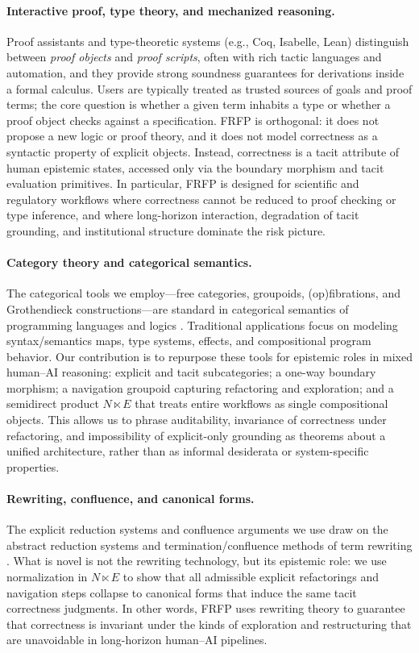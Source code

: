 \documentclass[11pt]{article}
\theoremstyle{definition}
\begin{document}
\paragraph{Interactive proof, type theory, and mechanized reasoning.}
Proof assistants and type-theoretic systems (e.g., Coq, Isabelle, Lean) distinguish between \emph{proof objects} and \emph{proof scripts}, often with rich tactic languages and automation, and they provide strong soundness guarantees for derivations inside a formal calculus. Users are typically treated as trusted sources of goals and proof terms; the core question is whether a given term inhabits a type or whether a proof object checks against a specification. FRFP is orthogonal: it does not propose a new logic or proof theory, and it does not model correctness as a syntactic property of explicit objects. Instead, correctness is a tacit attribute of human epistemic states, accessed only via the boundary morphism and tacit evaluation primitives. In particular, FRFP is designed for scientific and regulatory workflows where correctness cannot be reduced to proof checking or type inference, and where long-horizon interaction, degradation of tacit grounding, and institutional structure dominate the risk picture.

\paragraph{Category theory and categorical semantics.}
The categorical tools we employ---free categories, groupoids, (op)fibrations, and Grothendieck constructions---are standard in categorical semantics of programming languages and logics \citep{johnstone2002sketches,leinster2014basic,maclane1998categories}. Traditional applications focus on modeling syntax/semantics maps, type systems, effects, and compositional program behavior. Our contribution is to repurpose these tools for epistemic roles in mixed human--AI reasoning: explicit and tacit subcategories; a one-way boundary morphism; a navigation groupoid capturing refactoring and exploration; and a semidirect product $N \ltimes E$ that treats entire workflows as single compositional objects. This allows us to phrase auditability, invariance of correctness under refactoring, and impossibility of explicit-only grounding as theorems about a unified architecture, rather than as informal desiderata or system-specific properties.

\paragraph{Rewriting, confluence, and canonical forms.}
The explicit reduction systems and confluence arguments we use draw on the abstract reduction systems and termination/confluence methods of term rewriting \citep{baader1999term,terese2003term}. What is novel is not the rewriting technology, but its epistemic role: we use normalization in $N \ltimes E$ to show that all admissible explicit refactorings and navigation steps collapse to canonical forms that induce the same tacit correctness judgments. In other words, FRFP uses rewriting theory to guarantee that correctness is invariant under the kinds of exploration and restructuring that are unavoidable in long-horizon human--AI pipelines.
\end{document}

